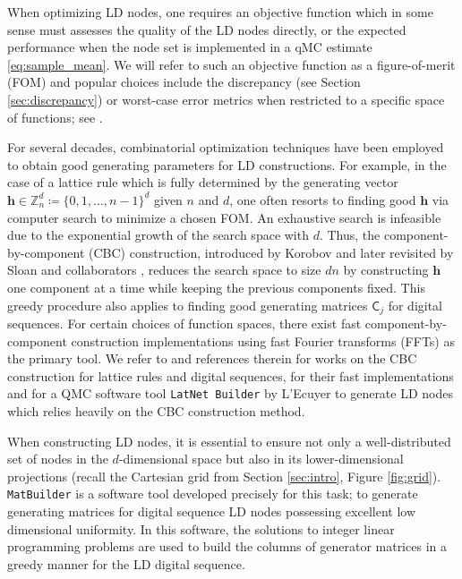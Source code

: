 \documentclass{svproc}
\begin{document}
When optimizing LD nodes, one requires an objective function which in some sense must assesses the quality of the LD nodes directly, or the expected performance when the node set is implemented in a qMC estimate \eqref{eq:sample_mean}.  We will refer to such an objective function as a figure-of-merit (FOM) and popular choices include the discrepancy (see Section \ref{sec:discrepancy}) or worst-case error metrics when restricted to a specific space of functions; see \cite{Hic00a,LatNet}.


For several decades, combinatorial optimization techniques have been employed to obtain good generating parameters for LD constructions. For example, in the case of a lattice rule which is fully determined by the generating vector \(\boldsymbol{h} \in \mathbb{Z}_n^d \coloneqq \{0, 1, \ldots, n-1\}^d\) given $n$ and $d$,
one often resorts to finding good $\boldsymbol{h}$ via computer search to minimize a chosen FOM. An exhaustive search is infeasible due to the exponential growth of the search space with \(d\). Thus, the component-by-component (CBC) construction, introduced by Korobov \cite{kor63} and later revisited by Sloan and collaborators \cite{Slo02}, reduces the search space to size \(dn\) by constructing \(\boldsymbol{h}\) one component at a time while keeping the previous components fixed. This greedy procedure also applies to finding good generating matrices $\mathsf{C}_j$ for digital sequences.
For certain choices of function spaces, there exist fast component-by-component construction implementations using fast Fourier transforms (FFTs) as the primary tool. We refer to \cite{DicKuo04a,JoeKuo03,KuoJoe02b,DicEtal22a} and references therein for works on the CBC construction for lattice rules and digital sequences, \cite{NuyCoo06a,NuyCoo06b} for their fast implementations and \cite{LEcEtal22a,LatNet} for a QMC software tool \texttt{LatNet Builder} by L'Ecuyer to generate LD nodes which relies heavily on the CBC construction method.


When constructing LD nodes, it is essential to ensure not only a well-distributed set of nodes in the $d$-dimensional space but also in its lower-dimensional projections (recall the Cartesian grid from Section \ref{sec:intro}, Figure \ref{fig:grid}). \texttt{MatBuilder} \cite{paulin2022} is a software tool developed precisely for this task; to generate generating matrices for digital sequence LD nodes possessing excellent low dimensional uniformity. In this software, the solutions to integer linear programming problems are used to build the columns of generator matrices in a greedy manner for the LD digital sequence.
\end{document}
